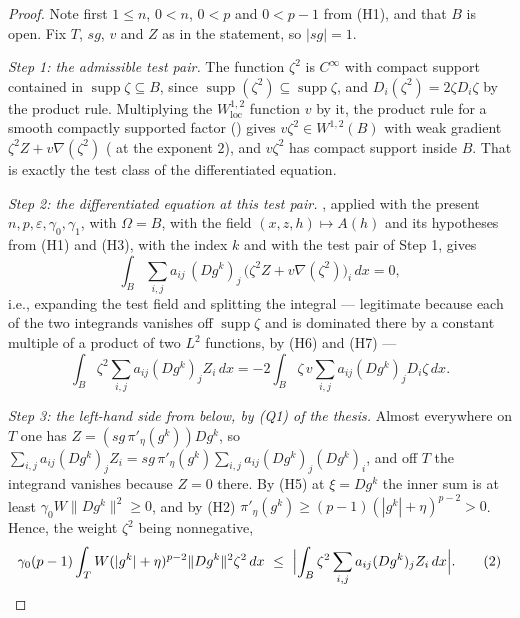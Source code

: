 \begin{proof}
Note first $1\le n$, $0<n$, $0<p$ and $0<p-1$ from (H1), and that $B$ is open.
Fix $T$, $sg$, $v$ and $Z$ as in the statement, so $|sg|=1$.

\emph{Step 1: the admissible test pair.}  The function $\zeta^2$ is $C^\infty$
with compact support contained in $\operatorname{supp}\zeta\subseteq B$, since
$\operatorname{supp}(\zeta^2)\subseteq\operatorname{supp}\zeta$, and
$D_i(\zeta^2)=2\zeta D_i\zeta$ by the product rule.  Multiplying the
$W^{1,2}_{\mathrm{loc}}$ function $v$ by it, the product rule for a smooth
compactly supported factor () gives
$v\zeta^2\in W^{1,2}(B)$ with weak gradient
$\zeta^2Z+v\nabla(\zeta^2)$ ( at the exponent $2$), and
$v\zeta^2$ has compact support inside $B$.  That is exactly the test class of
the differentiated equation.

\emph{Step 2: the differentiated equation at this test pair.}
, applied with the present
$n,p,\varepsilon,\gamma_0,\gamma_1$, with $\Omega=B$, with the field
$(x,z,h)\mapsto A(h)$ and its hypotheses from (H1) and (H3), with the index $k$
and with the test pair of Step 1, gives
\[
\int_B\sum_{i,j}a_{ij}\,(Dg^k)_j\,\bigl(\zeta^2Z+v\nabla(\zeta^2)\bigr)_i\,dx=0 ,
\]
i.e., expanding the test field and splitting the integral --- legitimate because
each of the two integrands vanishes off $\operatorname{supp}\zeta$ and is
dominated there by a constant multiple of a product of two $L^2$ functions, by
(H6) and (H7) ---
\[
\int_B\zeta^2\sum_{i,j}a_{ij}(Dg^k)_jZ_i\,dx
=-2\int_B\zeta\,v\sum_{i,j}a_{ij}(Dg^k)_jD_i\zeta\,dx .
\tag{1}
\]

\emph{Step 3: the left-hand side from below, by (Q1) of the thesis.}  Almost
everywhere on $T$ one has $Z=(sg\,\pi'_\eta(g^k))Dg^k$, so
$\sum_{i,j}a_{ij}(Dg^k)_jZ_i
=sg\,\pi'_\eta(g^k)\sum_{i,j}a_{ij}(Dg^k)_j(Dg^k)_i$, and off $T$ the integrand
vanishes because $Z=0$ there.  By (H5) at $\xi=Dg^k$ the inner sum is at least
$\gamma_0W\|Dg^k\|^2\ge0$, and by (H2) $\pi'_\eta(g^k)\ge(p-1)(|g^k|+\eta)^{p-2}>0$.
Hence, the weight $\zeta^2$ being nonnegative,
\[
\gamma_0(p-1)\int_TW(|g^k|+\eta)^{p-2}\|Dg^k\|^2\zeta^2\,dx
\ \le\ \Bigl|\int_B\zeta^2\sum_{i,j}a_{ij}(Dg^k)_jZ_i\,dx\Bigr| .
\tag{2}
\]


\end{proof}
